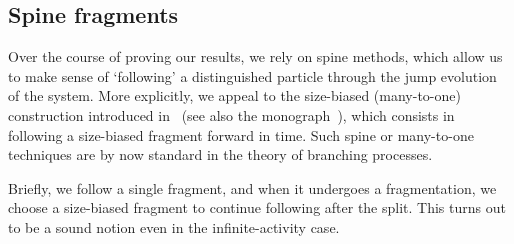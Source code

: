 \documentclass[a4,12pt]{amsart}
\numberwithin{equation}{section}
\begin{document}
\subsection{Spine fragments}

    Over the course of proving our results, we rely on spine methods, 
    which allow us to make sense of ‘following’ a distinguished particle 
    through the jump evolution of the system. 
    More explicitly, we appeal to the size-biased (many-to-one) construction 
    introduced in~\cite{bertoin1} (see also the monograph~\cite{bertoinbook}), 
    which consists in following a size-biased fragment forward in time. 
    Such spine or many-to-one techniques are by now standard in the theory 
    of branching processes.
    
    Briefly, we follow a single fragment, 
	and when it undergoes a fragmentation, we choose a size-biased fragment to continue 
	following after the split.
	This turns out to be a sound notion even in the infinite-activity case.
\end{document}
